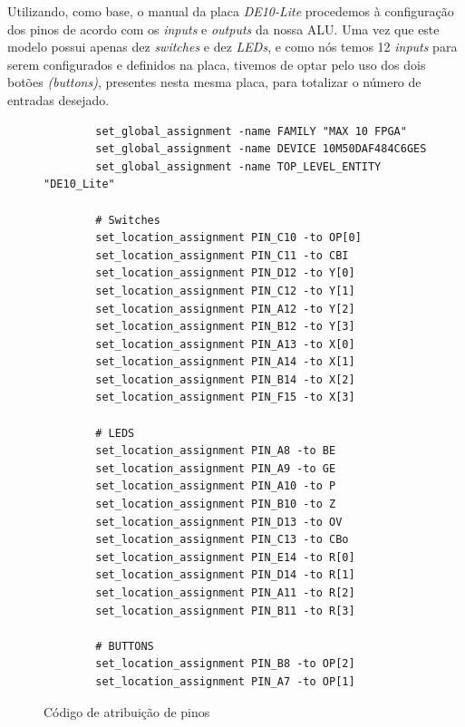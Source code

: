 

Utilizando, como base, o manual da placa \textit{DE10-Lite} procedemos à configuração dos pinos de acordo com os \textit{inputs} e \textit{outputs} da nossa ALU.
Uma vez que este modelo possui apenas dez \textit{switches} e dez \textit{LEDs}, e como nós temos 12 \textit{inputs} para serem configurados e definidos na placa, tivemos de optar pelo uso dos dois botões \textit{(buttons)}, presentes nesta mesma placa, para totalizar o número de entradas desejado.

\begin{figure}[H]
    \centering
    \scriptsize
    \begin{tcolorbox}[title=\textit{Pin Assignments},center title,halign=center,valign=center,text width=10cm]
    \begin{BVerbatim}
        set_global_assignment -name FAMILY "MAX 10 FPGA"
        set_global_assignment -name DEVICE 10M50DAF484C6GES
        set_global_assignment -name TOP_LEVEL_ENTITY "DE10_Lite"
        
        # Switches
        set_location_assignment PIN_C10 -to OP[0]
        set_location_assignment PIN_C11 -to CBI
        set_location_assignment PIN_D12 -to Y[0]
        set_location_assignment PIN_C12 -to Y[1]
        set_location_assignment PIN_A12 -to Y[2]
        set_location_assignment PIN_B12 -to Y[3]
        set_location_assignment PIN_A13 -to X[0]
        set_location_assignment PIN_A14 -to X[1]
        set_location_assignment PIN_B14 -to X[2]
        set_location_assignment PIN_F15 -to X[3]

        # LEDS
        set_location_assignment PIN_A8 -to BE
        set_location_assignment PIN_A9 -to GE
        set_location_assignment PIN_A10 -to P
        set_location_assignment PIN_B10 -to Z
        set_location_assignment PIN_D13 -to OV
        set_location_assignment PIN_C13 -to CBo
        set_location_assignment PIN_E14 -to R[0]
        set_location_assignment PIN_D14 -to R[1]
        set_location_assignment PIN_A11 -to R[2]
        set_location_assignment PIN_B11 -to R[3]

        # BUTTONS
        set_location_assignment PIN_B8 -to OP[2]
        set_location_assignment PIN_A7 -to OP[1]
    \end{BVerbatim}
    \end{tcolorbox}
    \caption{Código de atribuição de pinos}
\end{figure}
\newpage

